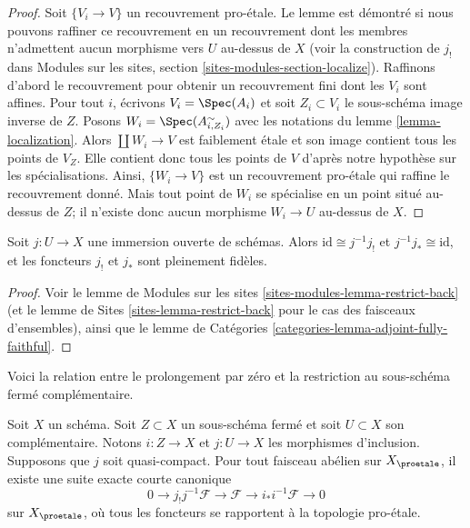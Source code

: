 \begin{proof}
Soit $\{V_i \to V\}$ un recouvrement pro-\'etale. Le lemme est démontré si nous
pouvons raffiner ce recouvrement en un recouvrement dont les membres n'admettent aucun
morphisme vers $U$ au-dessus de $X$ (voir la construction de $j_!$ dans
Modules sur les sites, section \ref{sites-modules-section-localize}).
Raffinons d'abord le recouvrement pour obtenir un recouvrement fini dont les $V_i$ sont affines.
Pour tout $i$, écrivons $V_i = \Spec(A_i)$ et soit $Z_i \subset V_i$ le
sous-schéma image inverse de $Z$.
Posons $W_i = \Spec(A_{i, Z_i}^\sim)$ avec les notations du
lemme \ref{lemma-localization}.
Alors $\coprod W_i \to V$ est faiblement \'etale et son image contient tous les
points de $V_Z$. Elle contient donc tous les points de $V$ d'après
notre hypothèse sur les spécialisations. Ainsi, $\{W_i \to V\}$ est un
recouvrement pro-\'etale qui raffine le recouvrement donné. Mais tout point de $W_i$
se spécialise en un point situé au-dessus de $Z$; il n'existe donc aucun morphisme
$W_i \to U$ au-dessus de $X$.
\end{proof}

\begin{lemma}
\label{lemma-open-immersion}
Soit $j : U \to X$ une immersion ouverte de schémas.
Alors $\text{id} \cong j^{-1}j_!$ et $j^{-1}j_* \cong \text{id}$,
et les foncteurs $j_!$ et $j_*$ sont pleinement fidèles.
\end{lemma}

\begin{proof}
Voir le lemme de Modules sur les sites \ref{sites-modules-lemma-restrict-back}
(et le lemme de Sites \ref{sites-lemma-restrict-back} pour le cas
des faisceaux d'ensembles), ainsi que le
lemme de Catégories \ref{categories-lemma-adjoint-fully-faithful}.
\end{proof}

\noindent
Voici la relation entre le prolongement par zéro et la restriction
au sous-schéma fermé complémentaire.

\begin{lemma}
\label{lemma-ses-associated-to-open}
Soit $X$ un schéma. Soit $Z \subset X$ un sous-schéma fermé et soit
$U \subset X$ son complémentaire. Notons $i : Z \to X$ et $j : U \to X$
les morphismes d'inclusion. Supposons que $j$ soit quasi-compact.
Pour tout faisceau abélien sur $X_\proetale$, il existe une suite exacte courte
canonique
$$
0 \to j_!j^{-1}\mathcal{F} \to \mathcal{F} \to i_*i^{-1}\mathcal{F} \to 0
$$
sur $X_\proetale$, où tous les foncteurs se rapportent à la topologie pro-\'etale.
\end{lemma}

